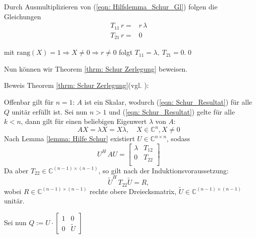 \documentclass[a4paper,12pt]{report}
\newcommand{\C}{\mathbb C}
\newcommand{\rang}{\text{rang}}
\theoremstyle{plain} %
\theoremstyle{definition} %
\theoremstyle{remark}
\begin{document}
                  
            Durch Ausmultiplizieren von (\ref{eqn: Hilfslemma_Schur_Gl}) folgen die Gleichungen\\

            $$\begin{aligned}
                  T_{11}\,r =& r\,\lambda\\
                  T_{21}\,r =& 0
            \end{aligned}$$

            mit $\rang(X)=1 \Rightarrow X\ne 0 \Rightarrow r\ne 0$ folgt $T_{11} = \lambda,\ T_{21} = 0$.\qed
            

            Nun können wir Theorem \ref{thrm: Schur Zerlegung} beweisen.


            Beweis Theorem \ref{thrm: Schur Zerlegung}(vgl. \cite[S. 313]{matrixGolub}):

            Offenbar gilt für $n=1$: $A$ ist ein Skalar, wodurch (\ref{eqn: Schur_Resultat}) für alle $Q$ unitär erfüllt ist.
            Sei nun $n>1$ und (\ref{eqn: Schur_Resultat}) gelte für alle $k<n$, dann gilt für einen beliebigen Eigenwert $\lambda$ von $A$:
            $$AX = \lambda X = X \lambda,\quad X\in \C^n, X\ne 0$$
            Nach Lemma \ref{lemma: Hilfe Schur} existiert $U\in \C^{n\times n}$, sodass
            $$U^H\, AU = \begin{bmatrix}
                  \lambda & T_{12} \\
                  0 & T_{22} \\
                  \end{bmatrix}$$
            Da aber $T_{22}\in\C^{(n-1)\times(n-1)}$, so gilt nach der Induktionsvoraussetzung:
            $$\widetilde U^H\,T_{22}\widetilde U = R,$$
            wobei $R\in\C^{(n-1)\times(n-1)}$  rechte obere Dreiecksmatrix, $\widetilde U \in\C^{(n-1)\times(n-1)}$ unitär.

            Sei nun $Q:=U\cdot\begin{bmatrix}
                  1&0\\
                  0&\widetilde U
            \end{bmatrix}$
\end{document}
